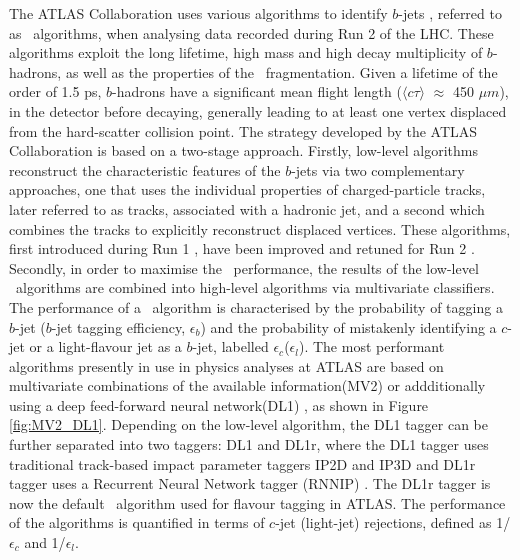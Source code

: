 \documentclass[letterpaper,12pt]{article}
\begin{document}
The ATLAS Collaboration uses various algorithms to identify 
$b$-jets \cite{PERF-2012-04}, referred to as \btagging\ algorithms, 
when analysing data recorded during Run 2 of the LHC. These 
algorithms exploit the long lifetime, high mass and high decay 
multiplicity of $b$-hadrons, as well as the properties of the \bquark\  
fragmentation. Given a lifetime of the order of 1.5 ps, $b$-hadrons have a 
significant mean flight length ($\langle c\tau \rangle$ $\approx$ 450 $\mu m$), 
in the detector before decaying, generally leading to at least one vertex 
displaced from the hard-scatter collision point. The strategy 
developed by the ATLAS Collaboration is based on a two-stage approach. 
Firstly, low-level algorithms reconstruct the characteristic features of 
the $b$-jets via two complementary approaches, one that uses the 
individual properties of charged-particle tracks, later referred 
to as tracks, associated with a hadronic jet, and a second which 
combines the tracks to explicitly reconstruct displaced vertices. 
These algorithms, first introduced during Run 1 \cite{PERF-2012-04}, 
have been improved and retuned for Run 2 \cite{FTAG-2018-01}. 
Secondly, in order to 
maximise the \btagging\ performance, the results of the low-level 
\btagging\ algorithms are combined into high-level algorithms 
via multivariate classifiers. 
The performance of a 
\btagging\ algorithm is characterised by the probability of 
tagging a $b$-jet ($b$-jet tagging efficiency, $\epsilon_b$) and 
the probability of mistakenly identifying a $c$-jet or a light-flavour 
jet as a $b$-jet, labelled $\epsilon_c$($\epsilon_l$). 
The most performant algorithms presently in use in physics 
analyses at ATLAS are based on multivariate combinations 
of the available information(MV2) or addditionally using a
deep feed-forward neural network(DL1) \cite{tagging,ATL-PHYS-PUB-2017-013}, as shown in 
Figure \ref{fig:MV2_DL1}. Depending on the low-level algorithm, 
the DL1 tagger can be further separated into two taggers: DL1 and DL1r,
 where the DL1 tagger uses traditional track-based impact parameter 
 taggers IP2D and IP3D and DL1r tagger uses a Recurrent Neural Network tagger 
 (RNNIP) \cite{ATL-PHYS-PUB-2017-013}. The DL1r tagger is now the 
 default \btagging\ algorithm used for flavour tagging in ATLAS.
 The performance of the algorithms is quantified 
in terms of $c$-jet (light-jet) rejections, defined as 
1/$\epsilon_c$ and 1/$\epsilon_l$. 
\end{document}
